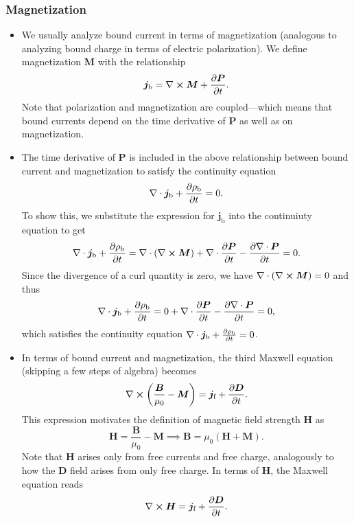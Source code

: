 \documentclass[11pt, a4paper]{article}
\renewcommand{\vec}[1]{\bm{#1}} %
\newcommand{\D}{\vec{D}}  %
\newcommand{\B}{\vec{B}} %
\renewcommand{\H}{\vec{H}}  %
\renewcommand{\P}{\vec{P}}  %
\newcommand{\M}{\vec{M}}  %
\newcommand{\mm}{\mu_{0}}  %
\renewcommand{\j}{\vec{j}}  %
\renewcommand{\div}{\nabla \cdot}
\renewcommand{\curl}{\nabla \cross}
\begin{document}
\subsubsection{Magnetization}
\begin{itemize}
    \item We usually analyze bound current in terms of magnetization (analogous to analyzing bound charge in terms of electric polarization). We define magnetization $ \M $ with the relationship
	\begin{equation*}
		\j_{\text{b}} = \curl \M + \pdv{\P}{t}.
	\end{equation*}
	Note that polarization and magnetization are coupled---which means that bound currents depend on the time derivative of $ \P $ as well as on magnetization. 
	
	\item The time derivative of $ \P $ is included in the above relationship between bound current and magnetization to satisfy the continuity equation
    \begin{equation*}
        \div \j_{\text{b}} + \pdv{\rho_{\text{b}}}{t} = 0.
    \end{equation*}
    To show this, we substitute the expression for $ \j_{\text{b}} $ into the continuiuty equation to get
	\begin{equation*}
		\div \j_{\text{b}} + \pdv{\rho_{\text{b}}}{t} = \div (\curl \M) + \div \pdv{\P}{t} - \pdv{\div \P}{t} = 0.
	\end{equation*}
	Since the divergence of a curl quantity is zero, we have $ \div (\curl \M) = 0 $ and thus
    \begin{equation*}
        \div \j_{\text{b}} + \pdv{\rho_{\text{b}}}{t} = 0 + \div \pdv{\P}{t} - \pdv{\div \P}{t} = 0,
    \end{equation*}
    which satisfies the continuity equation $ \div \j_{\text{b}} + \pdv{\rho_{\text{b}}}{t} = 0 $. 
    
	
    \item In terms of bound current and magnetization, the third Maxwell equation (skipping a few steps of algebra) becomes
	\begin{equation*}
		\curl \left(\frac{\B}{\mm} - \M\right) = \j_{\text{f}} + \pdv{\D}{t}.
	\end{equation*}
    This expression motivates the definition of magnetic field strength $ \H $ as
	\begin{equation*}
		\H = \frac{\B}{\mm} - \M \implies \B = \mm (\H + \M).
	\end{equation*}
	Note that $ \H $ arises only from free currents and free charge, analogously to how the $ \D $ field arises from only free charge. In terms of $ \H $, the Maxwell equation reads
	\begin{equation*}
		\curl \H = \j_{\text{f}} + \pdv{\D}{t}.
	\end{equation*}
\end{itemize}
\end{document}
